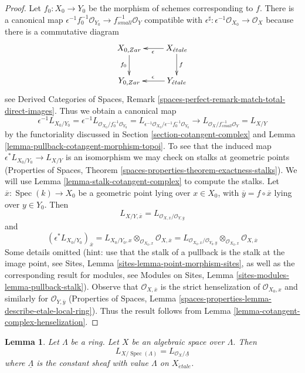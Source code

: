 \documentclass{stacks-project}
\theoremstyle{plain}
\newtheorem{lemma}[subsection]{Lemma}
\theoremstyle{definition}
\theoremstyle{remark}
\numberwithin{equation}{subsection}
\def\Spec{\mathop{\mathrm{Spec}}}
\def\etale{{\acute{e}tale}}
\begin{document}
\begin{proof}
Let $f_0 : X_0 \to Y_0$ be the morphism of schemes corresponding to $f$.
There is a canonical map
$\epsilon^{-1}f_0^{-1}\mathcal{O}_{Y_0} \to f_{small}^{-1}\mathcal{O}_Y$
compatible with
$\epsilon^\sharp : \epsilon^{-1}\mathcal{O}_{X_0} \to \mathcal{O}_X$
because there is a commutative diagram
$$
\xymatrix{
X_{0, Zar} \ar[d]_{f_0} & X_\etale \ar[l]^\epsilon \ar[d]^f \\
Y_{0, Zar} & Y_\etale \ar[l]_\epsilon
}
$$
see Derived Categories of Spaces, Remark
\ref{spaces-perfect-remark-match-total-direct-images}.
Thus we obtain a canonical map
$$
\epsilon^{-1}L_{X_0/Y_0} =
\epsilon^{-1}L_{\mathcal{O}_{X_0}/f_0^{-1}\mathcal{O}_{Y_0}} =
L_{\epsilon^{-1}\mathcal{O}_{X_0}/\epsilon^{-1}f_0^{-1}\mathcal{O}_{Y_0}}
\longrightarrow
L_{\mathcal{O}_X/f^{-1}_{small}\mathcal{O}_Y} = L_{X/Y}
$$
by the functoriality discussed in Section \ref{section-cotangent-complex}
and Lemma \ref{lemma-pullback-cotangent-morphism-topoi}.
To see that the induced map $\epsilon^*L_{X_0/Y_0} \to L_{X/Y}$ is an
isomorphism we may check on stalks at geometric points
(Properties of Spaces, Theorem
\ref{spaces-properties-theorem-exactness-stalks}).
We will use Lemma \ref{lemma-stalk-cotangent-complex}
to compute the stalks. Let $\overline{x} : \Spec(k) \to X_0$
be a geometric point lying over $x \in X_0$, with
$\overline{y} = f \circ \overline{x}$ lying over $y \in Y_0$. Then
$$
L_{X/Y, \overline{x}} =
L_{\mathcal{O}_{X, \overline{x}}/\mathcal{O}_{Y, \overline{y}}}
$$
and
$$
(\epsilon^*L_{X_0/Y_0})_{\overline{x}} =
L_{X_0/Y_0, x} \otimes_{\mathcal{O}_{X_0, x}}
\mathcal{O}_{X, \overline{x}} =
L_{\mathcal{O}_{X_0, x}/\mathcal{O}_{Y_0, y}}
\otimes_{\mathcal{O}_{X_0, x}} \mathcal{O}_{X, \overline{x}}
$$
Some details omitted (hint: use that the stalk of a pullback
is the stalk at the image point, see
Sites, Lemma \ref{sites-lemma-point-morphism-sites},
as well as the corresponding result for modules, see
Modules on Sites, Lemma \ref{sites-modules-lemma-pullback-stalk}).
Observe that $\mathcal{O}_{X, \overline{x}}$ is the strict
henselization of $\mathcal{O}_{X_0, x}$ and similarly
for $\mathcal{O}_{Y, \overline{y}}$
(Properties of Spaces, Lemma
\ref{spaces-properties-lemma-describe-etale-local-ring}).
Thus the result follows from
Lemma \ref{lemma-cotangent-complex-henselization}.
\end{proof}

\begin{lemma}
\label{lemma-space-over-ring}
Let $\Lambda$ be a ring. Let $X$ be an algebraic space over $\Lambda$.
Then
$$
L_{X/\Spec(\Lambda)} = L_{\mathcal{O}_X/\underline{\Lambda}}
$$
where $\underline{\Lambda}$ is the constant sheaf with value
$\Lambda$ on $X_\etale$.
\end{lemma}
\end{document}
